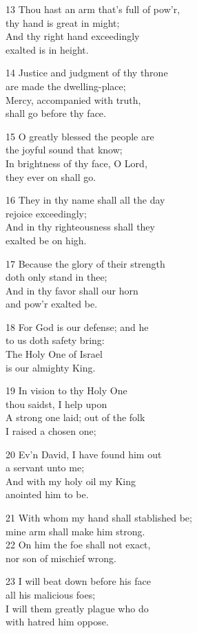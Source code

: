 13 Thou hast an arm that’s full of pow’r,\\
thy hand is great in might;\\
And thy right hand exceedingly\\
exalted is in height.

14 Justice and judgment of thy throne\\
are made the dwelling-place;\\
Mercy, accompanied with truth,\\
shall go before thy face.

15 O greatly blessed the people are\\
the joyful sound that know;\\
In brightness of thy face, O Lord,\\
they ever on shall go.

16 They in thy name shall all the day\\
rejoice exceedingly;\\
And in thy righteousness shall they\\
exalted be on high.

17 Because the glory of their strength\\
doth only stand in thee;\\
And in thy favor shall our horn\\
and pow’r exalted be.

18 For God is our defense; and he\\
to us doth safety bring:\\
The Holy One of Israel\\
is our almighty King.

19 In vision to thy Holy One\\
thou saidst, I help upon\\
A strong one laid; out of the folk\\
I raised a chosen one;

20 Ev’n David, I have found him out\\
a servant unto me;\\
And with my holy oil my King\\
anointed him to be.

21 With whom my hand shall stablished be;\\
mine arm shall make him strong.\\
22 On him the foe shall not exact,\\
nor son of mischief wrong.

23 I will beat down before his face\\
all his malicious foes;\\
I will them greatly plague who do\\
with hatred him oppose.

